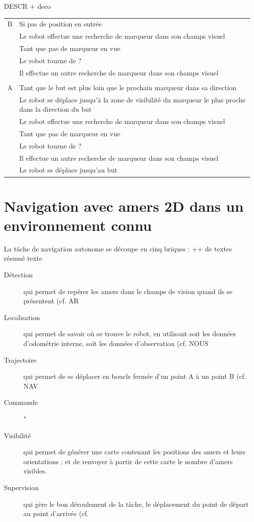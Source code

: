 \documentclass[10pt,a4paper]{article}
\begin{document}
DESCR + deco\\
\begin{tabular}{cl}
B & Si pas de position en entrée  \\
  & Le robot effectue une recherche de marqueur dans son champs visuel \\
  & Tant que pas de marqueur en vue \\
  & Le robot tourne de ? \\
  & Il effectue un autre recherche de marqueur dans son champs visuel \\
& \\
A & Tant que le but est plus loin que le prochain marqueur dans sa direction \\
  & Le robot se déplace jusqu’à la zone de visibilité du marqueur le plus proche dans la direction du but  \\
  & Le robot effectue une recherche de marqueur dans son champs visuel \\
  & Tant que pas de marqueur en vue  \\
  & Le robot tourne de ?  \\
  & Il effectue un autre recherche de marqueur dans son champs visuel \\
  & Le robot se déplace jusqu’au but  \\
\end{tabular}

\section{Navigation avec amers 2D dans un environnement connu}
\label{sec:navigation_avec_amers_2D_dans_un_environnement_connu}

La tâche de navigation autonome se découpe en cinq briques : ++ de textes résumé texte 
\begin{description}
\item [Détection] qui permet de repérer les amers dans le champs de vision quand ils se présentent (cf. AR
\item [Localisation] qui permet de savoir où se trouve le robot, en utilisant soit les données d'odométrie interne, soit les données d’observation (cf. NOUS
\item [Trajectoire] qui permet de se déplacer en boucle fermée d'un point A à un point B (cf. NAV
\item [Commande] "
\item [Visibilité] qui permet de générer une carte contenant les positions des amers et leurs orientations ; et de renvoyer à partir de cette carte le nombre d'amers visibles.
\item [Supervision] qui gère le bon déroulement de la tâche, le déplacement du point de départ au point d'arrivée (cf. 
\end{description}
\end{document}
